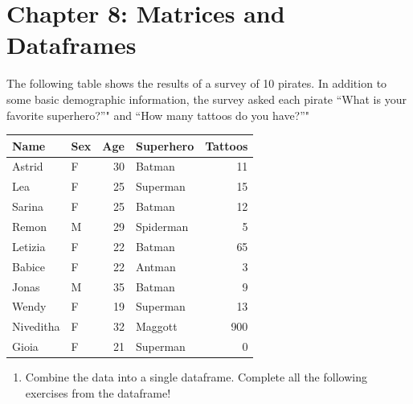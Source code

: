 \documentclass[]{book}
\providecommand{\tightlist}{%
  \setlength{\itemsep}{0pt}\setlength{\parskip}{0pt}}
\theoremstyle{definition}
\theoremstyle{definition}
\theoremstyle{remark}
\begin{document}
\section{Chapter 8: Matrices and
Dataframes}\label{chapter-8-matrices-and-dataframes}

The following table shows the results of a survey of 10 pirates. In
addition to some basic demographic information, the survey asked each
pirate ``What is your favorite superhero?''" and ``How many tattoos do
you have?''"

\begin{tabular}{l|l|r|l|r}
\hline
Name & Sex & Age & Superhero & Tattoos\\
\hline
Astrid & F & 30 & Batman & 11\\
\hline
Lea & F & 25 & Superman & 15\\
\hline
Sarina & F & 25 & Batman & 12\\
\hline
Remon & M & 29 & Spiderman & 5\\
\hline
Letizia & F & 22 & Batman & 65\\
\hline
Babice & F & 22 & Antman & 3\\
\hline
Jonas & M & 35 & Batman & 9\\
\hline
Wendy & F & 19 & Superman & 13\\
\hline
Niveditha & F & 32 & Maggott & 900\\
\hline
Gioia & F & 21 & Superman & 0\\
\hline
\end{tabular}

\begin{enumerate}
\def\labelenumi{\arabic{enumi}.}
\tightlist
\item
  Combine the data into a single dataframe. Complete all the following
  exercises from the dataframe!
\end{enumerate}
\end{document}
